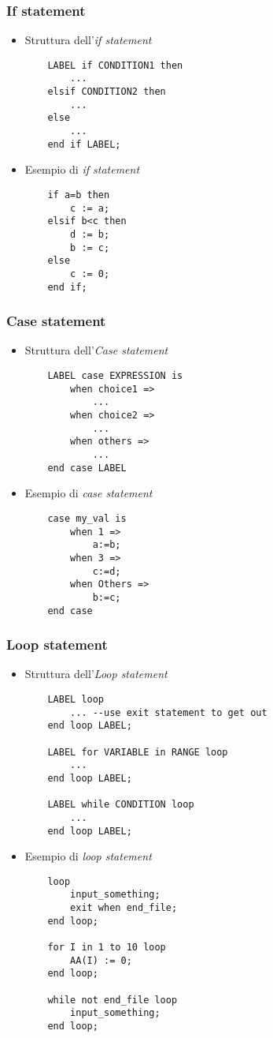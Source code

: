 \documentclass{article}
\begin{document}
\subsubsection{If statement}
\begin{itemize}
	\item Struttura dell'\textit{if statement}
	      \begin{verbatim}
    LABEL if CONDITION1 then
        ...
    elsif CONDITION2 then
        ...
    else
        ...
    end if LABEL;
	      \end{verbatim}
	\item Esempio di \textit{if statement}
	      \begin{verbatim}
    if a=b then
        c := a;
    elsif b<c then
        d := b;
        b := c;
    else
        c := 0;
    end if;
	      \end{verbatim}
\end{itemize}
\subsubsection{Case statement}
\begin{itemize}
	\item Struttura dell'\textit{Case statement}
	      \begin{verbatim}
    LABEL case EXPRESSION is
        when choice1 =>
            ...
        when choice2 =>
            ...
        when others =>
            ...
    end case LABEL
	      \end{verbatim}
	\item Esempio di \textit{case statement}
	      \begin{verbatim}
    case my_val is
        when 1 =>
            a:=b;
        when 3 =>
            c:=d;
        when Others =>
            b:=c;
    end case
	      \end{verbatim}
\end{itemize}
\newpage
\subsubsection{Loop statement}
\begin{itemize}
	\item Struttura dell'\textit{Loop statement}
	      \begin{verbatim}
    LABEL loop
        ... --use exit statement to get out
    end loop LABEL;
    
    LABEL for VARIABLE in RANGE loop
        ...
    end loop LABEL;
    
    LABEL while CONDITION loop
        ...
    end loop LABEL;
	      \end{verbatim}
	\item Esempio di \textit{loop statement}
	      \begin{verbatim}
    loop
        input_something;
        exit when end_file;
    end loop;
    
    for I in 1 to 10 loop
        AA(I) := 0;
    end loop;
    
    while not end_file loop
        input_something;
    end loop;
	      \end{verbatim}
\end{itemize}
\end{document}
